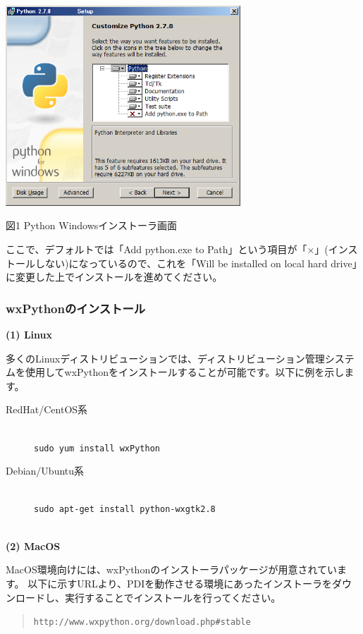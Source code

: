 \documentclass[a4paper,11pt]{jarticle}
\begin{document}
\begin{center}
\includegraphics[width=250pt, bb=0 0 499 425]{figs/fig000.png}

図1 Python Windowsインストーラ画面
\end{center}

ここで、デフォルトでは「Add python.exe to Path」という項目が「×」(インストールしない)になっているので、これを「Will be installed on local hard drive」に変更した上でインストールを進めてください。
{\ }\\


\subsubsection{wxPythonのインストール}

\textbf{(1) Linux}

多くのLinuxディストリビューションでは、ディストリビューション管理システムを使用してwxPythonをインストールすることが可能です。以下に例を示します。

\begin{description}
\item[RedHat/CentOS系] {\ }\\
{\tt sudo yum install wxPython}\\
\item[Debian/Ubuntu系] {\ }\\
{\tt sudo apt-get install python-wxgtk2.8}
\end{description}
{\ }\\


\textbf{(2) MacOS}

MacOS環境向けには、wxPythonのインストーラパッケージが用意されています。
以下に示すURLより、PDIを動作させる環境にあったインストーラをダウンロードし、実行することでインストールを行ってください。
\begin{quote}
{\tt http://www.wxpython.org/download.php\#stable}
\end{quote}
{\ }\\
\end{document}
